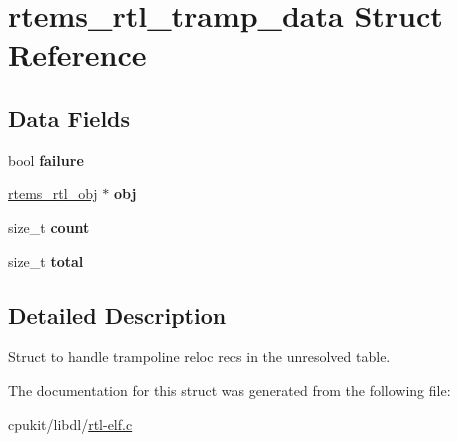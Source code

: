\hypertarget{structrtems__rtl__tramp__data}{}\section{rtems\+\_\+rtl\+\_\+tramp\+\_\+data Struct Reference}
\label{structrtems__rtl__tramp__data}
\subsection*{Data Fields}
\begin{DoxyCompactItemize}
\item 
\mbox{\label{structrtems__rtl__tramp__data_aa6c51720aa548ce67b999ccefa416dae}} 
bool {\bfseries failure}
\item 
\mbox{\label{structrtems__rtl__tramp__data_a8c1e56cb9cfc660eb97ad33b72315fb3}} 
\mbox{\hyperlink{structrtems__rtl__obj}{rtems\+\_\+rtl\+\_\+obj}} $\ast$ {\bfseries obj}
\item 
\mbox{\label{structrtems__rtl__tramp__data_aa2e94495ae1483af008e94b91a53235d}} 
size\+\_\+t {\bfseries count}
\item 
\mbox{\label{structrtems__rtl__tramp__data_a114a1e17e8dd14db81d50bbd06d5f821}} 
size\+\_\+t {\bfseries total}
\end{DoxyCompactItemize}


\subsection{Detailed Description}
Struct to handle trampoline reloc recs in the unresolved table. 

The documentation for this struct was generated from the following file\+:\begin{DoxyCompactItemize}
\item 
cpukit/libdl/\mbox{\hyperlink{rtl-elf_8c}{rtl-\/elf.\+c}}\end{DoxyCompactItemize}
